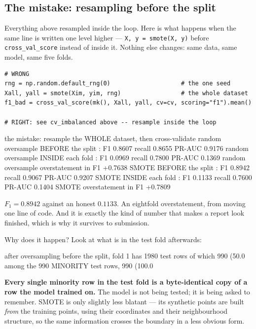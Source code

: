 \documentclass[11pt]{article}
\begin{document}
\subsection{The mistake: resampling before the split}
\label{sec:resampleleak}

Everything above resampled inside the loop. Here is what happens when the same
line is written one level higher --- \texttt{X, y = smote(X, y)} before
\texttt{cross\_val\_score} instead of inside it. Nothing else changes: same
data, same model, same five folds.

\begin{lstlisting}
# WRONG
rng = np.random.default_rng(0)                    # the one seed
Xall, yall = smote(Xim, yim, rng)                 # the whole dataset
f1_bad = cross_val_score(mk(), Xall, yall, cv=cv, scoring="f1").mean()

# RIGHT: see cv_imbalanced above -- resample inside the loop
\end{lstlisting}
\begin{codeout}
the mistake: resample the WHOLE dataset, then cross-validate
   random oversample  BEFORE the split : F1 0.8607  recall 0.8655  PR-AUC 0.9176
   random oversample  INSIDE each fold : F1 0.0969  recall 0.7800  PR-AUC 0.1369
   random oversample  overstatement in F1 +0.7638
   SMOTE              BEFORE the split : F1 0.8942  recall 0.9067  PR-AUC 0.9207
   SMOTE              INSIDE each fold : F1 0.1133  recall 0.7600  PR-AUC 0.1404
   SMOTE              overstatement in F1 +0.7809
\end{codeout}

$F_1 = 0.8942$ against an honest $0.1133$. An eightfold overstatement, from
moving one line of code. And it is exactly the kind of number that makes a
report look finished, which is why it survives to submission.

Why does it happen? Look at what is in the test fold afterwards:

\begin{codeout}
   after oversampling before the split, fold 1 has 1980 test rows
   of which 990 (50.0%
   among the 990 MINORITY test rows, 990 (100.0%
\end{codeout}

\textbf{Every single minority row in the test fold is a byte-identical copy of
a row the model trained on.} The model is not being tested; it is being asked
to remember. SMOTE is only slightly less blatant --- its synthetic points are
built \emph{from} the training points, using their coordinates and their
neighbourhood structure, so the same information crosses the boundary in a
less obvious form.
\end{document}
